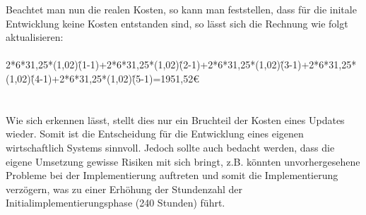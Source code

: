 Beachtet man nun die realen Kosten, so kann man feststellen, dass für die initale Entwicklung keine Kosten entstanden sind, so lässt sich die Rechnung wie folgt aktualisieren:\\
\\
2*6*31,25*(1,02)\^(1-1)+2*6*31,25*(1,02)\^(2-1)+2*6*31,25*(1,02)\^(3-1)+2*6*31,25*(1,02)\^(4-1)+2*6*31,25*(1,02)\^(5-1)=1951,52€\\
\\
\\
Wie sich erkennen lässt, stellt dies nur ein Bruchteil der Kosten eines Updates wieder.
Somit ist die Entscheidung für die Entwicklung eines eigenen wirtschaftlich Systems sinnvoll.
Jedoch sollte auch bedacht werden, dass die eigene Umsetzung gewisse Risiken mit sich bringt, z.B. könnten unvorhergesehene Probleme bei der Implementierung auftreten und somit die Implementierung verzögern, was zu einer Erhöhung der Stundenzahl der Initialimplementierungsphase (240 Stunden) führt.\\
